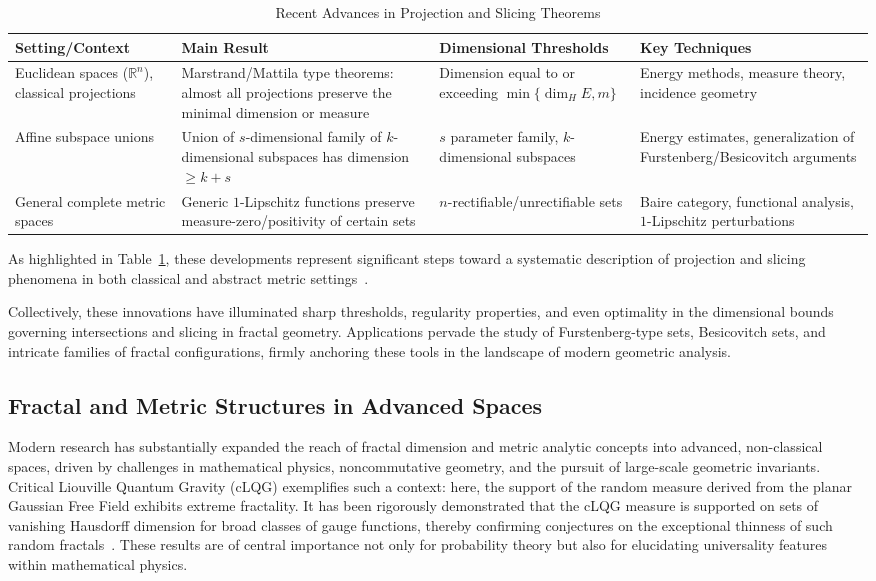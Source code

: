 \documentclass[11pt]{article}
\begin{document}
\begin{table}[h]
\centering
\caption{Recent Advances in Projection and Slicing Theorems}
\label{tab:proj_slice_advances}
\begin{tabular}{|p{2.2cm}|p{4.7cm}|p{3.0cm}|p{4.2cm}|}
\hline
\textbf{Setting/Context} & \textbf{Main Result} & \textbf{Dimensional Thresholds} & \textbf{Key Techniques} \\
\hline
Euclidean spaces (\(\mathbb{R}^n\)), classical projections & Marstrand/Mattila type theorems: almost all projections preserve the minimal dimension or measure & Dimension equal to or exceeding $\min\{\dim_H E, m\}$ & Energy methods, measure theory, incidence geometry \\
\hline
Affine subspace unions & Union of $s$-dimensional family of $k$-dimensional subspaces has dimension $\geq k+s$ & $s$ parameter family, $k$-dimensional subspaces & Energy estimates, generalization of Furstenberg/Besicovitch arguments \\
\hline
General complete metric spaces & Generic $1$-Lipschitz functions preserve measure-zero/positivity of certain sets & $n$-rectifiable/unrectifiable sets & Baire category, functional analysis, $1$-Lipschitz perturbations \\
\hline
\end{tabular}
\end{table}

As highlighted in Table~\ref{tab:proj_slice_advances}, these developments represent significant steps toward a systematic description of projection and slicing phenomena in both classical and abstract metric settings~\cite{ref74,ref21,ref75}.

Collectively, these innovations have illuminated sharp thresholds, regularity properties, and even optimality in the dimensional bounds governing intersections and slicing in fractal geometry. Applications pervade the study of Furstenberg-type sets, Besicovitch sets, and intricate families of fractal configurations, firmly anchoring these tools in the landscape of modern geometric analysis.

\subsection{Fractal and Metric Structures in Advanced Spaces}

Modern research has substantially expanded the reach of fractal dimension and metric analytic concepts into advanced, non-classical spaces, driven by challenges in mathematical physics, noncommutative geometry, and the pursuit of large-scale geometric invariants. Critical Liouville Quantum Gravity (cLQG) exemplifies such a context: here, the support of the random measure derived from the planar Gaussian Free Field exhibits extreme fractality. It has been rigorously demonstrated that the cLQG measure is supported on sets of vanishing Hausdorff dimension for broad classes of gauge functions, thereby confirming conjectures on the exceptional thinness of such random fractals~\cite{ref81}. These results are of central importance not only for probability theory but also for elucidating universality features within mathematical physics.
\end{document}
